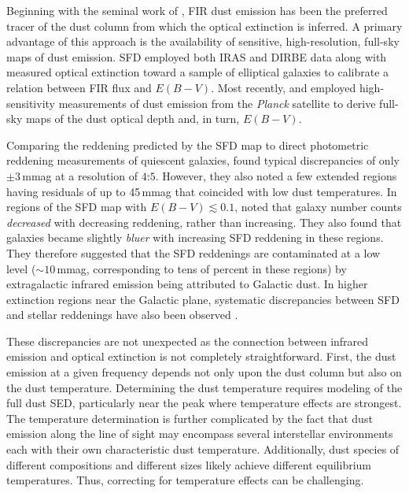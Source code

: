 \documentclass[iop,apj]{emulateapj}
\begin{document}
Beginning with the seminal work of \citet[][hereafter SFD]{Schlegel+Finkbeiner+Davis_1998}, FIR dust emission has been the preferred tracer of the dust column from which the optical extinction is inferred. A primary advantage of this approach is the availability of sensitive, high-resolution, full-sky maps of dust emission. SFD employed both IRAS and DIRBE data along with measured optical extinction toward a sample of elliptical galaxies to calibrate a relation between FIR flux and $E(B-V)$. Most recently, \citet{Planck_2013_XI} and \citet[][hereafter MF]{Meisner+Finkbeiner_2015} employed high-sensitivity measurements of dust emission from the {\it Planck} satellite to derive full-sky maps of the dust optical depth and, in turn, $E(B-V)$.

Comparing the reddening predicted by the SFD map to direct photometric reddening measurements of quiescent galaxies, \citet{Peek+Graves_2010} found typical discrepancies of only $\pm3$\,mmag at a resolution of $4\overset{\circ}{.}5$. However, they also noted a few extended regions having residuals of up to 45\,mmag that coincided with low dust temperatures. In regions of the SFD map with $E(B-V) \lesssim 0.1$, \citet{Yahata+etal_2007} noted that galaxy number counts {\it decreased} with decreasing reddening, rather than increasing. They also found that galaxies became slightly {\it bluer} with increasing SFD reddening in these regions. They therefore suggested that the SFD reddenings are contaminated at a low level ($\sim 10$\,mmag, corresponding to tens of percent in these regions) by extragalactic infrared emission being attributed to Galactic dust. In higher extinction regions near the Galactic plane, systematic discrepancies between SFD and stellar reddenings have also been observed \citep{Schlafly+etal_2014}.

These discrepancies are not unexpected as the connection between infrared emission and optical extinction is not completely straightforward. First, the dust emission at a given frequency depends not only upon the dust column but also on the dust temperature. Determining the dust temperature requires modeling of the full dust SED, particularly near the peak where temperature effects are strongest. The temperature determination is further complicated by the fact that dust emission along the line of sight may encompass several interstellar environments each with their own characteristic dust temperature. Additionally, dust species of different compositions and different sizes likely achieve different equilibrium temperatures. Thus, correcting for temperature effects can be challenging.
\end{document}
